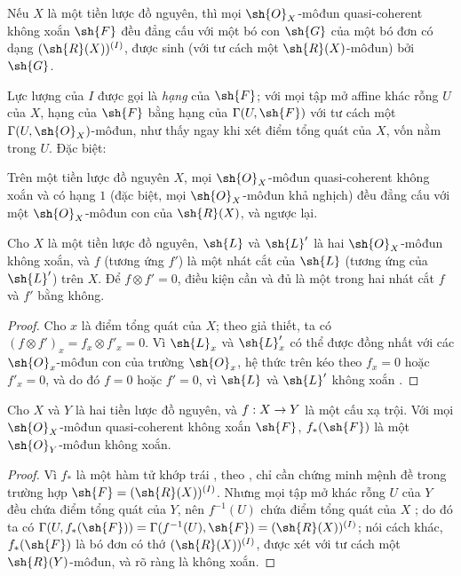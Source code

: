 \documentclass[oneside]{amsart}
\makeatletter
\newcommand{\ega@arrow}[2]{\mathchoice{#1}{#2}{#2}{#2}}
\renewcommand{\to}{\ega@arrow{\longrightarrow}{\rightarrow}}
\newcommand{\oldpage}[2][]{{\marginnote{\normalfont\textbf{#1}~|~#2}}\ignorespaces}
\let\EGAOriginalLabel\label
\renewcommand{\label}[1]{\phantomsection\EGAOriginalLabel{#1}}
\makeatother
\begin{document}
\begin{proposition}[7.4.2]
\label{I.7.4.2}
Nếu $X$ là một tiền lược đồ nguyên, thì mọi $\sh{O}_X$-môđun quasi-coherent không xoắn $\sh{F}$ đều đẳng cấu với một bó con $\sh{G}$ của một bó đơn có dạng $(\sh{R}(X))^{(I)}$, được sinh (với tư cách một $\sh{R}(X)$-môđun) bởi $\sh{G}$.
\end{proposition}

Lực lượng của $I$ được gọi là \emph{hạng} của $\sh{F}$; với mọi tập mở affine khác rỗng $U$ của $X$, hạng của $\sh{F}$ bằng hạng của $\Gamma(U,\sh{F})$ với tư cách một $\Gamma(U,\sh{O}_X)$-môđun, như thấy ngay khi xét điểm tổng quát của $X$, vốn nằm trong $U$.
Đặc biệt:

\begin{corollary}[7.4.3]
\label{I.7.4.3}
Trên một tiền lược đồ nguyên $X$, mọi $\sh{O}_X$-môđun quasi-coherent không xoắn và có hạng $1$ (đặc biệt, mọi $\sh{O}_X$-môđun khả nghịch) đều đẳng cấu với một $\sh{O}_X$-môđun con của $\sh{R}(X)$, và ngược lại.
\end{corollary}

\begin{corollary}[7.4.4]
\label{I.7.4.4}
Cho $X$ là một tiền lược đồ nguyên, $\sh{L}$ và $\sh{L}'$ là hai $\sh{O}_X$-môđun không xoắn, và $f$ (tương ứng $f'$) là một nhát cắt của $\sh{L}$ (tương ứng của $\sh{L}'$) trên $X$.
Để $f\otimes f'=0$, điều kiện cần và đủ là một trong hai nhát cắt $f$ và $f'$ bằng không.
\end{corollary}

\begin{proof}
Cho $x$ là điểm tổng quát của $X$; theo giả thiết, ta có $(f\otimes f')_x=f_x\otimes f'_x=0$.
Vì $\sh{L}_x$ và $\sh{L}'_x$ có thể được đồng nhất với các $\sh{O}_x$-môđun con của trường $\sh{O}_x$, hệ thức trên kéo theo $f_x=0$ hoặc $f'_x=0$, và do đó $f=0$ hoặc $f'=0$, vì $\sh{L}$ và $\sh{L}'$ không xoắn .
\end{proof}

\begin{proposition}[7.4.5]
\label{I.7.4.5}
Cho $X$ và $Y$ là hai tiền lược đồ nguyên, và $f:X\to Y$ là một cấu xạ trội.
Với mọi $\sh{O}_X$-môđun quasi-coherent không xoắn $\sh{F}$, $f_*(\sh{F})$ là một $\sh{O}_Y$-môđun không xoắn.
\end{proposition}

\oldpage[I]{164}
\begin{proof}
Vì $f_*$ là một hàm tử khớp trái , theo , chỉ cần chứng minh mệnh đề trong trường hợp $\sh{F}=(\sh{R}(X))^{(I)}$.
Nhưng mọi tập mở khác rỗng $U$ của $Y$ đều chứa điểm tổng quát của $Y$, nên $f^{-1}(U)$ chứa điểm tổng quát của $X$ ; do đó ta có $\Gamma(U,f_*(\sh{F}))=\Gamma(f^{-1}(U),\sh{F})=(\sh{R}(X))^{(I)}$; nói cách khác, $f_*(\sh{F})$ là bó đơn có thớ $(\sh{R}(X))^{(I)}$, được xét với tư cách một $\sh{R}(Y)$-môđun, và rõ ràng là không xoắn.
\end{proof}
\end{document}
